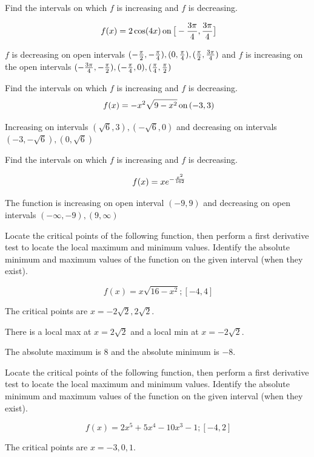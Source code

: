 Find the intervals on which $f$ is increasing and $f$ is decreasing.

$$\
f(x) = 2 \cos (4x)  \, \hbox{on} \, \big[ -{3\pi \over 4}, {3 \pi \over 4} \big]
$$

$f$ is decreasing on open intervals
$(-{\pi \over 2}, -{\pi \over 4}), (0, {\pi \over 4}), ({\pi \over 2}, {3 \pi \over 4})$
and $f$ is increasing on the open intervals
$(-{3\pi \over 4}, -{\pi \over 2}), (-{\pi \over 4}, 0), ({\pi \over 4}, {\pi \over 2})$

Find the intervals on which $f$ is increasing and $f$ is decreasing.
$$\
f(x) = -x^2\sqrt{9 - x^2} \, \hbox{on} \, (-3, 3)
$$

Increasing on intervals $(\sqrt{6}, 3), (-\sqrt{6}, 0)$ and
decreasing on intervals $(-3, -\sqrt{6}), (0, \sqrt{6})$

Find the intervals on which $f$ is increasing and $f$ is decreasing.

$$\
f(x) = xe^{-{x^2 \over 162}}
$$

The function is increasing on open interval $(-9, 9)$ and
decreasing on open intervals $(-\infty, -9), (9, \infty)$

\problem{4.3.47}
Locate the critical points of the following function, then
perform a first derivative test to locate the local maximum and
minimum values. Identify the absolute minimum and maximum values
of the function on the given interval (when they exist).

$$\
f(x) = x \sqrt{16 - x^2}; [-4, 4]
$$

\par The critical points are $x = -2\sqrt{2}, 2\sqrt{2}$.

\par There is a local max at $x = 2 \sqrt{2}$ and a local min
at $x = -2\sqrt{2}$.
\par The absolute maximum is $8$ and the absolute minimum
is $-8$.

\problem{4.3.50}
Locate the critical points of the following function, then
perform a first derivative test to locate the local maximum and
minimum values. Identify the absolute minimum and maximum values
of the function on the given interval (when they exist).

$$\
f(x) = 2x^5 + 5x^4 - 10x^3 -1; [-4, 2]
$$

The critical points are $x = -3,0, 1$.

